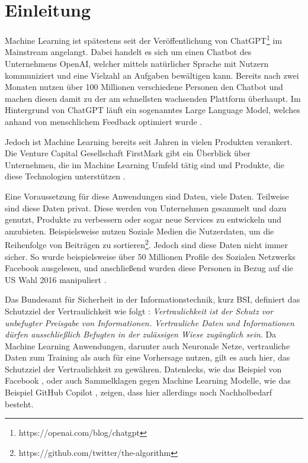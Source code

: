 \chapter{Einleitung}\label{sec:introduction}

Machine Learning ist spätestens seit der Veröffentlichung von ChatGPT\footnote{https://openai.com/blog/chatgpt} im Mainstream angelangt. 
Dabei handelt es sich um einen Chatbot des Unternehmens OpenAI, welcher mittels natürlicher Sprache mit Nutzern kommuniziert und eine Vielzahl an Aufgaben bewältigen kann.
Bereits nach zwei Monaten nutzen über 100 Millionen verschiedene Personen den Chatbot und machen diesen damit zu der am schnellsten wachsenden Plattform überhaupt.
Im Hintergrund von ChatGPT läuft ein sogenanntes Large Language Model, welches anhand von menschlichem Feedback optimiert wurde \cite{P-84}. 

Jedoch ist Machine Learning bereits seit Jahren in vielen Produkten verankert.
Die Venture Capital Gesellschaft FirstMark gibt ein Überblick über Unternehmen, die im Machine Learning Umfeld tätig sind und Produkte, die diese Technologien unterstützen \cite{I-4}.

Eine Voraussetzung für diese Anwendungen sind Daten, viele Daten.
Teilweise sind diese Daten privat.
Diese werden von Unternehmen gesammelt und dazu genutzt, Produkte zu verbessern oder sogar neue Services zu entwickeln und anzubieten. 
Beispielsweise nutzen Soziale Medien die Nutzerdaten, um die Reihenfolge von Beiträgen zu sortieren\footnote{https://github.com/twitter/the-algorithm}. 
Jedoch sind diese Daten nicht immer sicher. 
So wurde beispielsweise über 50 Millionen Profile des Sozialen Netzwerks Facebook ausgelesen, und anschließend wurden diese Personen in Bezug auf die US Wahl 2016 manipuliert \cite{I-2}.

Das Bundesamt für Sicherheit in der Informationstechnik, kurz BSI, definiert das Schutzziel der Vertraulichkeit wie folgt \cite{bsi_it_grundschutz}: \textit{\dq Vertraulichkeit ist der Schutz vor unbefugter Preisgabe von Informationen. Vertrauliche Daten und Informationen dürfen ausschließlich Befugten in der zulässigen Wiese zugänglich sein\dq}. 
Da Machine Learning Anwendungen, darunter auch Neuronale Netze, vertrauliche Daten zum Training als auch für eine Vorhersage nutzen, gilt es auch hier, das Schutzziel der Vertraulichkeit zu gewähren.
Datenlecks, wie das Beispiel von Facebook \cite{I-2}, oder auch Sammelklagen gegen Machine Learning Modelle, wie das Beispiel GitHub Copilot \cite{I-5}, zeigen, dass hier allerdings noch Nachholbedarf besteht.

